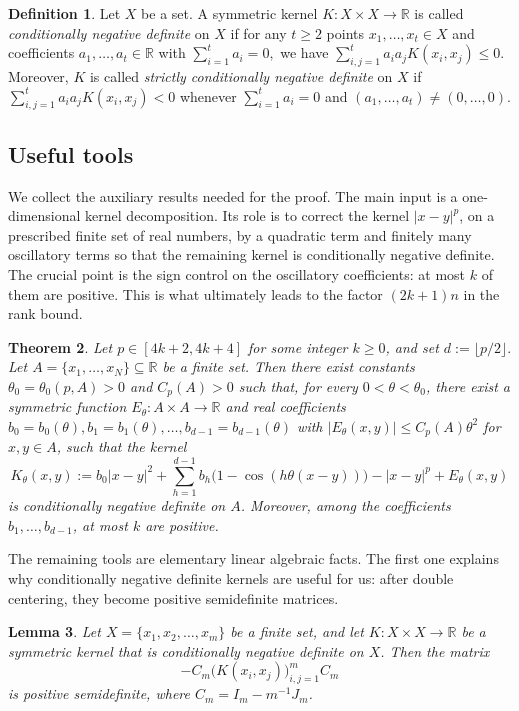 \documentclass[11pt]{article}
\newtheorem{theorem}{Theorem}[section]
\newtheorem{lemma}[theorem]{Lemma}
\theoremstyle{definition}
\newtheorem{defn}[theorem]{Definition}
\begin{document}
\begin{defn}
Let $X$ be a set. A symmetric kernel $K:X\times X\to \mathbb R$ is called
\emph{conditionally negative definite} on $X$ if for any $t\ge 2$ points
$x_1,\dots,x_t\in X$ and coefficients $a_1,\dots,a_t\in\mathbb R$ with
\(
\sum_{i=1}^t a_i=0,
\)
we have
\(
\sum_{i,j=1}^t a_i a_j K(x_i,x_j)\le 0.
\)
Moreover, $K$ is called \emph{strictly conditionally negative definite} on $X$ if
\(
\sum_{i,j=1}^t a_i a_j K(x_i,x_j)<0
\)
whenever $\sum_{i=1}^t a_i=0$ and $(a_1,\dots,a_t)\ne (0,\dots,0)$.
\end{defn}
\subsection{Useful tools}
We collect the auxiliary results needed for the proof. The main input is a
one-dimensional kernel decomposition. Its role is to correct the kernel
\(|x-y|^p\), on a prescribed finite set of real numbers, by a quadratic term
and finitely many oscillatory terms so that the remaining kernel is
conditionally negative definite. The crucial point is the sign control on the
oscillatory coefficients: at most \(k\) of them are positive. This is what
ultimately leads to the factor \((2k+1)n\) in the rank bound.


\begin{theorem}\label{thm:cnd}
Let \(p\in[4k+2,4k+4]\) for some integer \(k\ge 0\), and set
\(
d:=\lfloor p/2\rfloor.
\)
Let \(A=\{x_1,\dots,x_N\}\subseteq \mathbb R\) be a finite set. Then there exist
constants \(\theta_0=\theta_0(p,A)>0\) and \(C_p(A)>0\) such that, for every
\(0<\theta<\theta_0\), there exist a symmetric function
\(E_\theta:A\times A\to\mathbb R\) and real coefficients
\(
b_0=b_0(\theta), b_1=b_1(\theta),\dots,b_{d-1}=b_{d-1}(\theta)
\)
with
\(
|E_\theta(x,y)|\le C_p(A)\theta^2
\)
for \(x,y\in A\), such that the kernel
\[
K_\theta(x,y)
:=
b_0|x-y|^2
+\sum_{h=1}^{d-1} b_h\bigl(1-\cos(h\theta(x-y))\bigr)
-|x-y|^p
+E_\theta(x,y)
\]
is conditionally negative definite on \(A\). Moreover, among the coefficients
\(b_1,\dots,b_{d-1}\), at most \(k\) are positive.
\end{theorem}

The remaining tools are elementary linear algebraic facts. The first one explains
why conditionally negative definite kernels are useful for us: after double
centering, they become positive semidefinite matrices.

\begin{lemma}\label{lem:cnd posit}
Let \(X=\{x_1,x_2,\dots,x_m\}\) be a finite set, and let
\(K:X\times X\to\mathbb R\) be a symmetric kernel that is conditionally negative
definite on \(X\). Then the matrix
\[
-C_m\bigl(K(x_i,x_j)\bigr)_{i,j=1}^mC_m
\]
is positive semidefinite, where \(C_m=I_m-m^{-1}J_m\).
\end{lemma}
\end{document}
